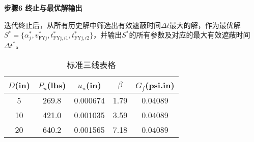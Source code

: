 \documentclass[../main.tex]{subfiles}
\begin{document}
\noindent\textbf{步骤6 终止与最优解输出}

迭代终止后，从所有历史解中筛选出有效遮蔽时间$\Delta t$最大的解，作为最优解$S^*=\{\alpha_j^*, v_{\text{FYj}}^*, t_{\text{FYj},i1}^*, t_{\text{FYj},i2}^*\}$，并输出$S^*$的所有参数及对应的最大有效遮蔽时间$\Delta t^*$。






\begin{table}[H]
\caption{标准三线表格}
\label{tab:001} 
\centering
\begin{tabular}{ccccc}
\toprule[1.5pt]
$D$(in) & $P_u$(lbs) & $u_u$(in) & $\beta$ & $G_f$(psi.in)\\
\midrule[1pt]
5 & 269.8 & 0.000674 & 1.79 & 0.04089\\
10 & 421.0 & 0.001035 & 3.59 & 0.04089\\
20 & 640.2 & 0.001565 & 7.18 & 0.04089\\
\bottomrule[1.5pt]
\end{tabular}
\end{table}

\end{document}
